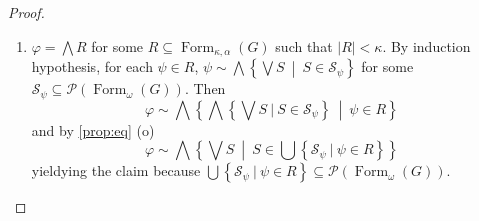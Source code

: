 \documentclass{article}
\theoremstyle{definition}
\DeclareMathOperator{\Ch}{Ch}
\DeclareMathOperator{\Formulas}{Form}
\begin{document}
\begin{proof}
\begin{enumerate}
\begin{align*}
        &\sim \bigwedge \left\{\bigvee \left\{\nec \bigvee I\ \middle\vert\ I \in \mathcal{P}_\omega(S)\right\} \middle\vert\ S \in \mathscr{S} \right\}
    \end{align*}
    by \cref{prop:eq} (ii) and (v). The claim holds for $\varphi$, since $S \subseteq \Formulas_\omega(G)$, hence $\nec \bigvee I \in \Formulas_\omega(G)$ for each $S \in \mathscr{S}$ and $I \in \mathcal{P}_\omega(S)$.
    \item $\varphi = \bigwedge R$ for some $R \subseteq \Formulas_{\kappa,\alpha}(G)$ such that $|R|<\kappa$. By induction hypothesis, for each $\psi \in R$, $\psi \sim \bigwedge \left\{\bigvee S\ \middle\vert\ S \in \mathscr{S}_\psi \right\}$ for some $\mathscr{S}_\psi \subseteq \mathcal{P}(\Formulas_\omega(G))$. 
    Then
    $$
    \varphi \sim  \bigwedge\left\{
      \bigwedge \left\{ 
          \bigvee S \ \vert \ S\in \mathscr{S}_\psi 
          \right\} 
        \ \middle \vert \ \psi\in R
    \right\}
    $$
    and by \cref{prop:eq} (o)
    $$
    \varphi \sim  \bigwedge\left\{ \bigvee S
        \ \middle \vert \ S\in \bigcup \left\{ \mathscr{S}_\psi \ \vert \  \psi\in R \right\}
    \right\}
    $$
    yieldying the claim because $\bigcup \left\{ \mathscr{S}_\psi \ \vert \  \psi\in R \right\}\subseteq \mathcal{P}(\Formulas_\omega(G))$.   %

\end{enumerate}
\end{proof}
\end{document}
